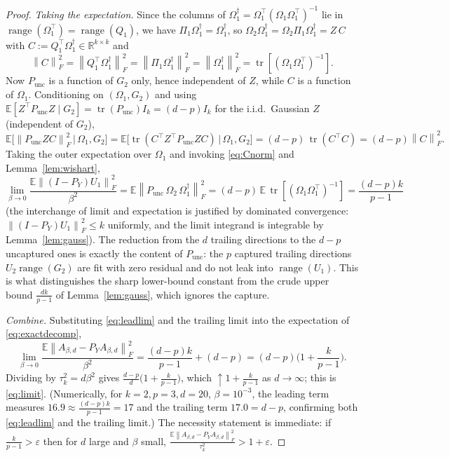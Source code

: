 \documentclass{amsart}
\theoremstyle{definition}
\DeclareMathOperator{\range}{range}
\DeclareMathOperator{\tr}{tr}
\newcommand{\R}{\mathbb{R}}
\newcommand{\Frob}[1]{\left\lVert #1\right\rVert_F}
\newcommand{\E}{\mathbb{E}}
\begin{document}
\begin{proof}
\emph{Taking the expectation.} Since the columns of
$\Omega_1^{\dagger}=\Omega_1^\top(\Omega_1\Omega_1^\top)^{-1}$ lie in
$\range(\Omega_1^\top)=\range(Q_1)$, we have $\Pi_1\Omega_1^{\dagger}=\Omega_1^{\dagger}$,
so $\Omega_2\Omega_1^{\dagger}=\Omega_2\Pi_1\Omega_1^{\dagger}=Z\,C$ with
$C:=Q_1^\top\Omega_1^{\dagger}\in\R^{k\times k}$ and
\begin{equation}\label{eq:Cnorm}
\Frob{C}^2=\Frob{Q_1^\top\Omega_1^{\dagger}}^2=\Frob{\Pi_1\Omega_1^{\dagger}}^2
=\Frob{\Omega_1^{\dagger}}^2=\tr[(\Omega_1\Omega_1^\top)^{-1}].
\end{equation}
Now $P_{\mathrm{unc}}$ is a function of $G_2$ only, hence independent of $Z$,
while $C$ is a function of $\Omega_1$. Conditioning on $(\Omega_1,G_2)$ and using
$\E[Z^\top P_{\mathrm{unc}}Z\mid G_2]=\tr(P_{\mathrm{unc}})I_k=(d-p)I_k$ for the
i.i.d.\ Gaussian $Z$ (independent of $G_2$),
\[
\E\big[\Frob{P_{\mathrm{unc}}ZC}^2\,\big|\,\Omega_1,G_2\big]
=\E\big[\tr(C^\top Z^\top P_{\mathrm{unc}}ZC)\,\big|\,\Omega_1,G_2\big]
=(d-p)\,\tr(C^\top C)=(d-p)\Frob{C}^2.
\]
Taking the outer expectation over $\Omega_1$ and invoking \eqref{eq:Cnorm} and
Lemma~\ref{lem:wishart},
\begin{equation}\label{eq:leadlim}
\lim_{\beta\to0}\frac{\E\Frob{(I-P_Y)U_1}^2}{\beta^2}
=\E\Frob{P_{\mathrm{unc}}\,\Omega_2\,\Omega_1^{\dagger}}^2
=(d-p)\,\E\,\tr[(\Omega_1\Omega_1^\top)^{-1}]=\frac{(d-p)k}{p-1}
\end{equation}
(the interchange of limit and expectation is justified by dominated convergence:
$\Frob{(I-P_Y)U_1}^2\le k$ uniformly, and the limit integrand is integrable by
Lemma~\ref{lem:gauss}). The reduction from the $d$ trailing directions to the
$d-p$ uncaptured ones is exactly the content of $P_{\mathrm{unc}}$: the $p$
captured trailing directions $U_2\range(G_2)$ are fit with zero residual and do
not leak into $\range(U_1)$. This is what distinguishes the sharp lower-bound
constant from the crude upper bound $\frac{dk}{p-1}$ of Lemma~\ref{lem:gauss},
which ignores the capture.

\emph{Combine.} Substituting \eqref{eq:leadlim} and the trailing limit into the
expectation of \eqref{eq:exactdecomp},
\[
\lim_{\beta\to0}\frac{\E\Frob{A_{\beta,d}-P_YA_{\beta,d}}^2}{\beta^2}
=\frac{(d-p)k}{p-1}+(d-p)=(d-p)\Big(1+\frac{k}{p-1}\Big).
\]
Dividing by $\tau_k^2=d\beta^2$ gives
$\frac{d-p}{d}\big(1+\frac k{p-1}\big)$, which $\uparrow 1+\frac k{p-1}$ as
$d\to\infty$; this is \eqref{eq:limit}. (Numerically, for $k=2,p=3,d=20$,
$\beta=10^{-3}$, the leading term measures $16.9\approx\frac{(d-p)k}{p-1}=17$ and
the trailing term $17.0=d-p$, confirming both \eqref{eq:leadlim} and the trailing
limit.) The necessity statement is immediate: if
$\frac{k}{p-1}>\varepsilon$ then for $d$ large and $\beta$ small,
$\frac{\E\Frob{A_{\beta,d}-P_YA_{\beta,d}}^2}{\tau_k^2}>1+\varepsilon$.
\end{proof}
\end{document}
